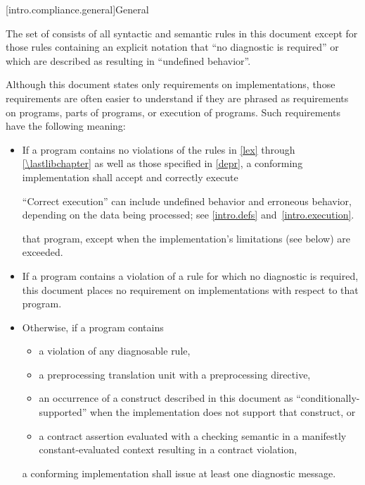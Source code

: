 [intro.compliance.general]{General}

\pnum
{}%
%
The set of
consists of all syntactic and semantic rules in this document
except for those rules containing an explicit notation that
``no diagnostic is required'' or which are described as resulting in
``undefined behavior''.

\pnum
{}%
Although this document states only requirements on \Cpp{}
implementations, those requirements are often easier to understand if
they are phrased as requirements on programs, parts of programs, or
execution of programs. Such requirements have the following meaning:
\begin{itemize}
\item
If a program contains no violations of the rules in
\ref{lex} through \ref{\lastlibchapter} as well as those specified in \ref{depr},
a conforming implementation shall accept and correctly execute
\begin{footnote}
``Correct execution'' can include undefined behavior
and erroneous behavior, depending on
the data being processed; see \ref{intro.defs} and~\ref{intro.execution}.
\end{footnote}
that program,
except when the implementation's limitations (see below) are exceeded.
\item
{}%
If a program contains a violation of a rule for which no diagnostic is required,
this document places no requirement on implementations
with respect to that program.

\item
{}%
%
%
Otherwise, if a program contains
\begin{itemize}
\item
a violation of any diagnosable rule,
\item
a preprocessing translation unit with
a  preprocessing directive,
\item
an occurrence
of a construct described in this document as ``conditionally-supported'' when
the implementation does not support that construct, or
\item
a contract assertion
evaluated with a checking semantic
in a manifestly constant-evaluated context
resulting in a contract violation,
\end{itemize}
a conforming implementation
shall issue at least one diagnostic message.
\end{itemize}
